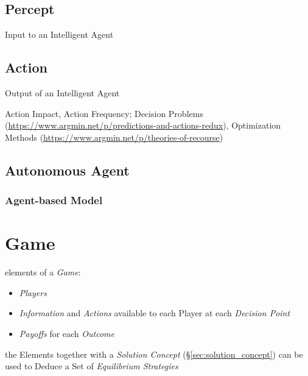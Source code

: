 
\subsection{Percept}\label{sec:percept}

Input to an Intelligent Agent



\subsection{Action}\label{sec:agent_action}

Output of an Intelligent Agent

Action Impact, Action Frequency; Decision Problems
(\url{https://www.argmin.net/p/predictions-and-actions-redux}),
Optimization Methods (\url{https://www.argmin.net/p/theories-of-recourse})



\subsection{Autonomous Agent}\label{sec:autonomous_agent}

\subsubsection{Agent-based Model}\label{sec:agent_based_model}



\section{Game}\label{sec:game}

elements of a \emph{Game}:
\begin{itemize}
  \item \emph{Players}
  \item \emph{Information} and \emph{Actions} available to each Player at each
    \emph{Decision Point}
  \item \emph{Payoffs} for each \emph{Outcome}
\end{itemize}
the Elements together with a \emph{Solution Concept}
(\S\ref{sec:solution_concept}) can be used to Deduce a Set of \emph{Equilibrium
  Strategies}

